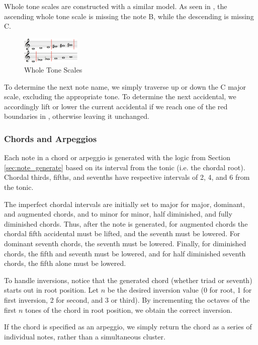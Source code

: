 \documentclass{article}
\begin{document}
Whole tone scales are constructed with a similar model. As seen in , the ascending whole tone scale is missing the note B, while the descending is missing C.

\begin{figure}[h!]
\centering
\includegraphics[width=0.25\textwidth]{images/whole_tone}
\caption{Whole Tone Scales}
\label{whole_tone}
\vspace{-2mm}
\end{figure}

To determine the next note name, we simply traverse up or down the C major scale, excluding the appropriate tone. To determine the next accidental, we accordingly lift or lower the current accidental if we reach one of the red boundaries in , otherwise leaving it unchanged.

\subsubsection{Chords and Arpeggios}
\label{sec:chord_expansion}
Each note in a chord or arpeggio is generated with the logic from Section \ref{sec:note_generate} based on its interval from the tonic (i.e. the chordal root). Chordal thirds, fifths, and sevenths have respective intervals of 2, 4, and 6 from the tonic.

The imperfect chordal intervals are initially set to major for major, dominant, and augmented chords, and to minor for minor, half diminished, and fully diminished chords. Thus, after the note is generated, for augmented chords the chordal fifth accidental must be lifted, and the seventh must be lowered. For dominant seventh chords, the seventh must be lowered. Finally, for diminished chords, the fifth and seventh must be lowered, and for half diminished seventh chords, the fifth alone must be lowered.

To handle inversions, notice that the generated chord (whether triad or seventh) starts out in root position. Let $n$ be the desired inversion value (0 for root, 1 for first inversion, 2 for second, and 3 or third). By incrementing the octaves of the first $n$ tones of the chord in root position, we obtain the correct inversion.

If the chord is specified as an arpeggio, we simply return the chord as a series of individual notes, rather than a simultaneous cluster.
\end{document}
